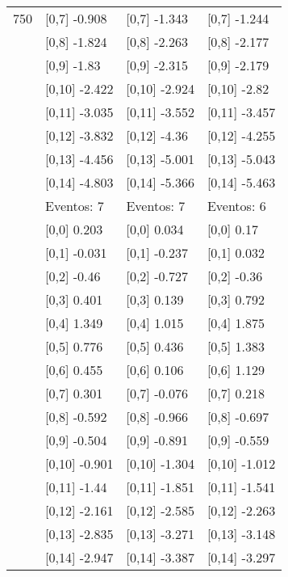 \begin{table}
\begin{tabular}[t]{llll}
750 & {}[0,7] -0.908 & {}[0,7] -1.343 & {}[0,7] -1.244\\
\addlinespace
 & {}[0,8] -1.824 & {}[0,8] -2.263 & {}[0,8] -2.177\\
 & {}[0,9] -1.83 & {}[0,9] -2.315 & {}[0,9] -2.179\\
 & {}[0,10] -2.422 & {}[0,10] -2.924 & {}[0,10] -2.82\\
 & {}[0,11] -3.035 & {}[0,11] -3.552 & {}[0,11] -3.457\\
 & {}[0,12] -3.832 & {}[0,12] -4.36 & {}[0,12] -4.255\\
\addlinespace
 & {}[0,13] -4.456 & {}[0,13] -5.001 & {}[0,13] -5.043\\
 & {}[0,14] -4.803 & {}[0,14] -5.366 & {}[0,14] -5.463\\
 & Eventos:  7 & Eventos:  7 & Eventos:  6\\
 & {}[0,0] 0.203 & {}[0,0] 0.034 & {}[0,0] 0.17\\
 & {}[0,1] -0.031 & {}[0,1] -0.237 & {}[0,1] 0.032\\
\addlinespace
 & {}[0,2] -0.46 & {}[0,2] -0.727 & {}[0,2] -0.36\\
 & {}[0,3] 0.401 & {}[0,3] 0.139 & {}[0,3] 0.792\\
 & {}[0,4] 1.349 & {}[0,4] 1.015 & {}[0,4] 1.875\\
 & {}[0,5] 0.776 & {}[0,5] 0.436 & {}[0,5] 1.383\\
 & {}[0,6] 0.455 & {}[0,6] 0.106 & {}[0,6] 1.129\\
\addlinespace
1000 & {}[0,7] 0.301 & {}[0,7] -0.076 & {}[0,7] 0.218\\
 & {}[0,8] -0.592 & {}[0,8] -0.966 & {}[0,8] -0.697\\
 & {}[0,9] -0.504 & {}[0,9] -0.891 & {}[0,9] -0.559\\
 & {}[0,10] -0.901 & {}[0,10] -1.304 & {}[0,10] -1.012\\
 & {}[0,11] -1.44 & {}[0,11] -1.851 & {}[0,11] -1.541\\
\addlinespace
 & {}[0,12] -2.161 & {}[0,12] -2.585 & {}[0,12] -2.263\\
 & {}[0,13] -2.835 & {}[0,13] -3.271 & {}[0,13] -3.148\\
 & {}[0,14] -2.947 & {}[0,14] -3.387 & {}[0,14] -3.297\\
\bottomrule
\end{tabular}
\end{table}
